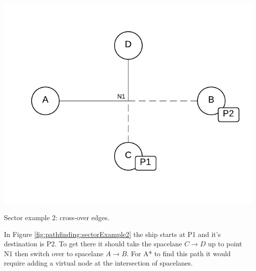 \begin{marginfigure}
	\includegraphics{res/pathfinding/PathFindingSector2.pdf}
    \caption[Sector example 2: cross-over edges]{Sector example 2: cross-over edges.}
	\label{fig:pathfinding:sectorExample2}
\end{marginfigure}
In Figure \ref{fig:pathfinding:sectorExample2} the ship starts at P1 and it's destination is P2.
To get there it should take the spacelane $C \to D$ up to point N1 then switch over to spacelane $A \to B$.
For A* to find this path it would require adding a virtual node at the intersection of spacelanes.

